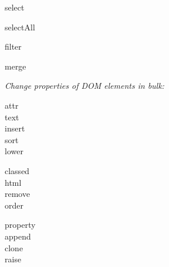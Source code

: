 {\footnotesize 
\begin{minipage}[t]{1.5cm}
    select
\end{minipage}
\begin{minipage}[t]{1.5cm}
    selectAll
\end{minipage}
\begin{minipage}[t]{1.5cm}
    filter
\end{minipage}
\begin{minipage}[t]{1.5cm}
    merge
\end{minipage}
}



\textit{Change properties of DOM elements in bulk:}

{\footnotesize 
\begin{minipage}[t]{2.0cm}
    attr\\
    text\\
    insert\\
    sort\\
    lower
\end{minipage}
\begin{minipage}[t]{2.0cm}
    classed\\
    html\\
    remove\\
    order\\
\end{minipage}
\begin{minipage}[t]{2.0cm}
    property\\
    append\\
    clone\\
    raise\\
\end{minipage}
}



\href{https://bost.ocks.org/mike/circles/}{}

